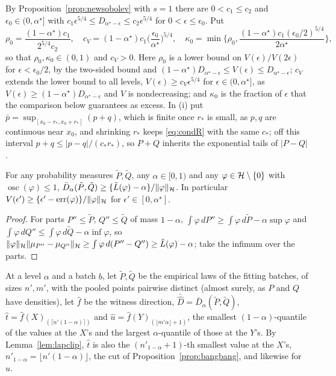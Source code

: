By Proposition~\ref{prop:newsobolev} with $s=1$ there are $0<c_1\le c_2$ and $\epsilon_0\in(0,\alpha^\star]$ with
$c_1\epsilon^{5/4}\le D_{\alpha^\star-\epsilon}\le c_2\epsilon^{5/4}$ for $0<\epsilon\le\epsilon_0$. Put
\[
\rho_0=\frac{(1-\alpha^\star)c_1}{2^{5/4}c_2},\quad c_V=(1-\alpha^\star)c_1\Big(\frac{\epsilon_0}{\alpha^\star}\Big)^{5/4},
\quad\kappa_0=\min\Big\{\rho_0,\frac{(1-\alpha^\star)c_1(\epsilon_0/2)^{5/4}}{2\alpha^\star}\Big\},
\]
so that $\rho_0,\kappa_0\in(0,1)$ and $c_V>0$. Here $\rho_0$ is a lower bound on $V(\epsilon)/V(2\epsilon)$
for $\epsilon<\epsilon_0/2$, by the two-sided bound and $(1-\alpha^\star)D_{\alpha^\star-\epsilon}\le V(\epsilon)\le
D_{\alpha^\star-\epsilon}$; $c_V$ extends the lower bound to all levels, $V(\epsilon)\ge c_V\epsilon^{5/4}$ for
$\epsilon\in(0,\alpha^\star]$, as $V(\epsilon)\ge(1-\alpha^\star)D_{\alpha^\star-\epsilon}$ and $V$ is nondecreasing; and
$\kappa_0$ is the fraction of $\epsilon$ that the comparison below guarantees as excess. In (i) put $\bar p=\sup_{[x_0-r_\ast,x_0+r_\ast]}(p+q)$, which is finite once $r_\ast$ is small, as $p,q$ are continuous near
$x_0$, and shrinking $r_\ast$ keeps \eqref{eq:condR} with the same $c_\ast$; off this
interval $p+q\le|p-q|/(c_\ast r_\ast)$, so $P+Q$ inherits the exponential tails of $|P-Q|$.

\begin{lemma}
\label{lem:lapratio}
For any probability measures $\tilde P,\tilde Q$, any $\alpha\in[0,1)$ and any $\varphi\in\mathcal{H}\setminus\{0\}$ with
$\operatorname{osc}(\varphi)\le1$, $\bar D_\alpha(\tilde P,\tilde Q)\ge\{\tilde L(\varphi)-\alpha\}/\|\varphi\|_{\mathcal{H}}$. In particular
$V(\epsilon')\ge\{\epsilon'-\mathrm{err}(\varphi)\}/\|\varphi\|_{\mathcal{H}}$ for $\epsilon'\in[0,\alpha^\star]$.
\end{lemma}

\begin{proof}
For parts $P''\le\tilde P$, $Q''\le\tilde Q$ of mass $1-\alpha$, $\int\varphi\,dP''\ge\int\varphi\,d\tilde P-\alpha\sup\varphi$ and
$\int\varphi\,dQ''\le\int\varphi\,d\tilde Q-\alpha\inf\varphi$, so $\|\varphi\|_{\mathcal{H}}\|\mu_{P''}-\mu_{Q''}\|_{\mathcal{H}}\ge
\int\varphi\,d(P''-Q'')\ge\tilde L(\varphi)-\alpha$; take the infimum over the parts.
\end{proof}

At a level $\alpha$ and a batch $b$, let $\tilde P,\tilde Q$ be the empirical laws of the fitting batches, of sizes
$n',m'$, with the pooled points pairwise distinct (almost surely, as $P$ and $Q$ have densities), let $\widehat f$ be the witness direction, $\bar{\widehat D}=\bar
D_\alpha(\tilde P,\tilde Q)$, $\widehat t=\widehat f(X)_{(\lceil n'(1-\alpha)\rceil)}$ and $\widehat u=\widehat f(Y)_{(\lfloor m'\alpha\rfloor+1)}$,
the smallest $(1-\alpha)$-quantile of the values at the $X$'s and the largest $\alpha$-quantile of those at the $Y$'s.
By Lemma~\ref{lem:lapclip}, $\widehat t$ is also the $(n'_{1-\alpha}+1)$-th smallest value at the $X$'s,
$n'_{1-\alpha}=\lfloor n'(1-\alpha)\rfloor$, the cut of Proposition~\ref{prop:bangbang}, and likewise for $\widehat u$.

